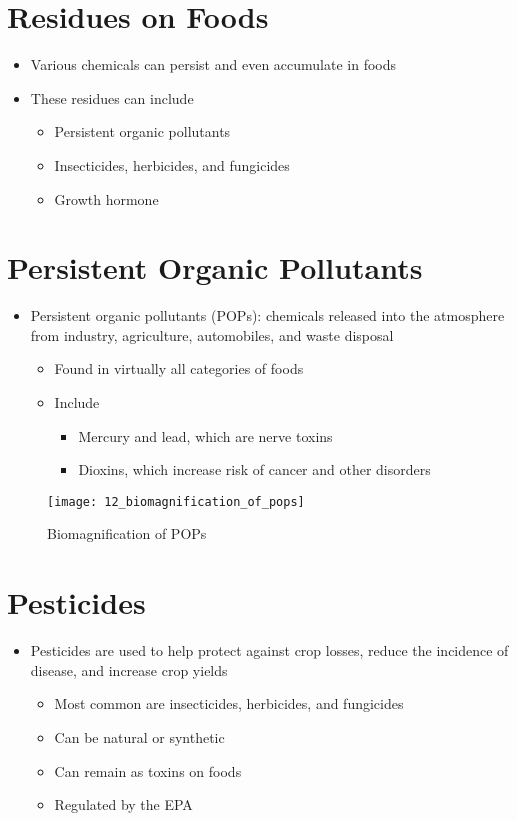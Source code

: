 \documentclass[title={Chapter 12}]{fdsn201notes}
\begin{document}
\section{Residues on Foods}\label{sec:residues-on-foods}
\begin{itemize}
	\item Various chemicals can persist and even accumulate in foods
	\item These residues can include
	\begin{itemize}
		\item Persistent organic pollutants
		\item Insecticides, herbicides, and fungicides
		\item Growth hormone
	\end{itemize}
\end{itemize}

\section{Persistent Organic Pollutants}\label{sec:persistent-organic-pollutants}
\begin{itemize}
	\item Persistent organic pollutants (POPs): chemicals released into the atmosphere from industry, agriculture, automobiles, and waste disposal
	\begin{itemize}
		\item Found in virtually all categories of foods
		\item Include
		\begin{itemize}
			\item Mercury and lead, which are nerve toxins
			\item Dioxins, which increase risk of cancer and other disorders
		\end{itemize}
	\end{itemize}
\end{itemize}

\begin{figure}[H]
	\centering
	\texttt{[image: 12\_biomagnification\_of\_pops]}
	\caption{Biomagnification of POPs}
	\label{fig:biomagnification-of-pops}
\end{figure}

\section{Pesticides}\label{sec:pesticides}
\begin{itemize}
	\item Pesticides are used to help protect against crop losses, reduce the incidence of disease, and increase crop yields
	\begin{itemize}
		\item Most common are insecticides, herbicides, and fungicides
		\item Can be natural or synthetic
		\item Can remain as toxins on foods
		\item Regulated by the EPA
	\end{itemize}
\end{itemize}
\end{document}
